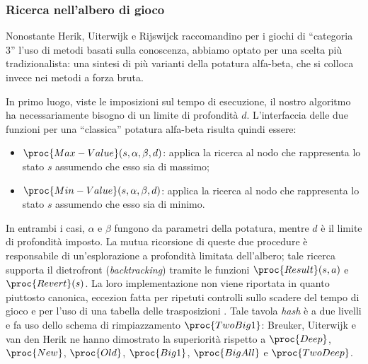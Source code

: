 \documentclass{article}
\begin{document}
\subsubsection{Ricerca nell'albero di gioco}

Nonostante Herik, Uiterwijk e Rijswijck \cite{VANDENHERIK2002277} raccomandino
per i giochi di ``categoria 3'' l'uso di metodi basati sulla conoscenza,
abbiamo optato per una scelta più tradizionalista: una sintesi di più varianti
della potatura alfa-beta, che si colloca invece nei metodi a forza bruta.

\begin{sloppypar}
In primo luogo, viste le imposizioni sul tempo di esecuzione, il nostro
algoritmo ha necessariamente bisogno di un limite di profondità $d$.
L'interfaccia delle due funzioni per una ``classica'' potatura alfa-beta
\cite{at.UBO029034619980101.200--202} risulta quindi essere:
\end{sloppypar}
\begin{itemize}
  \item $\proc{Max-Value}(s, \alpha, \beta, d)$: applica la ricerca
    al nodo che rappresenta lo stato $s$ assumendo che esso sia di massimo;
  \item $\proc{Min-Value}(s, \alpha, \beta, d)$: applica la ricerca
    al nodo che rappresenta lo stato $s$ assumendo che esso sia di minimo.
\end{itemize}
In entrambi i casi, $\alpha$ e $\beta$ fungono da parametri della potatura,
mentre $d$ è il limite di profondità imposto. La mutua ricorsione di queste
due procedure è responsabile di un'esplorazione a profondità limitata
dell'albero; tale ricerca supporta il dietrofront
\cite{at.UBO029034619980101.108} (\emph{backtracking}) tramite le funzioni
$\proc{Result}(s, a)$ e $\proc{Revert}(s)$.
La loro implementazione non viene riportata in quanto piuttosto canonica,
eccezion fatta per ripetuti controlli sullo scadere del tempo di gioco e per
l'uso di una tabella delle trasposizioni \cite{CN020689428}. Tale tavola
\emph{hash} è a due livelli e fa uso dello schema di rimpiazzamento
$\proc{TwoBig1}$: Breuker, Uiterwijk e van den Herik
\cite{BREUKER-UITERWIJK-VANDENHERIK}
\cite{edsdbl.journals.icga.BreukerUH9619960101} ne hanno dimostrato la
superiorità rispetto a $\proc{Deep}$, $\proc{New}$, $\proc{Old}$, $\proc{Big1}$,
$\proc{BigAll}$ e $\proc{TwoDeep}$.
\end{document}
